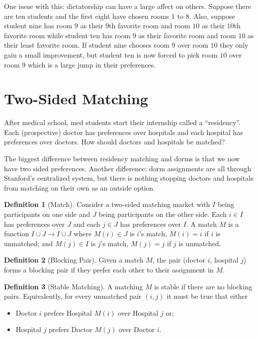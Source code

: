 \documentclass[dvipsnames]{article}
\theoremstyle{definition}
\newtheorem{definition}{Definition}[section]
\theoremstyle{remark}
\begin{document}
One issue with this: dictatorship can have a large affect on others. Suppose there are ten students and the first eight have chosen rooms $1$ to $8$. Also, suppose student nine has room $9$ as their $9$th favorite room and room $10$ as their $10$th favorite room while student ten has room $9$ as their favorite room and room $10$ as their least favorite room. If student nine chooses room $9$ over room $10$ they only gain a small improvement, but student ten is now forced to pick room $10$ over room $9$ which is a large jump in their preferences. 

\newpage

\section{Two-Sided Matching}
After medical school, med students start their internship called a ``residency''. Each (prospective) doctor has preferences over hospitals and each hospital has preferences over doctors. How should doctors and hospitals be matched?

The biggest difference between residency matching and dorms is that we now have two sided preferences. Another difference: dorm assignments are all through Stanford's centralized system, but there is nothing stopping doctors and hospitals from matching on their own as an outside option.

\begin{definition}[Match]
	Consider a two-sided matching market with $I$ being participants on one side and $J$ being participants on the other side. Each $i \in I$ has preferences over $J$ and each $j \in J$ has preferences over $I$. A match $M$ is a function $I \cup J \to I \cup J$ where $M(i) \in J$ is $i$'s match, $M(i) = i$ if $i$ is unmatched; and $M(j) \in I$ is $j$'s match, $M(j) = j$ if $j$ is unmatched. 
\end{definition}

\begin{definition}[Blocking Pair]
	Given a match $M$, the pair (doctor $i$, hospital $j$) forms a blocking pair if they prefer each other to their assignment in $M$.
\end{definition}

\begin{definition}[Stable Matching]
	A matching $M$ is stable if there are no blocking pairs. Equivalently, for every unmatched pair $(i,j)$ it must be true that either
	\begin{itemize}
		\item Doctor $i$ prefers Hospital $M(i)$ over Hospital $j$ or;
		\item Hospital $j$ prefers Doctor $M(j)$ over Doctor $i$.
	\end{itemize}
\end{definition}
\end{document}
